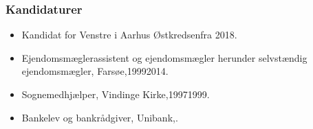 \documentclass[11pt, a4paper]{awesome-cv}
\begin{document}
\begin{cvletter}
\subsubsection*{Kandidaturer}
\begin{itemize}
\item Kandidat for Venstre i Aarhus Østkredsenfra 2018.
\end{itemize}
\begin{itemize}
\item Ejendomsmæglerassistent og ejendomsmægler herunder selvstændig ejendomsmægler, Farsøe,19992014.
\item Sognemedhjælper, Vindinge Kirke,19971999.
\item Bankelev og bankrådgiver, Unibank,.
\end{itemize}
\end{cvletter}
\end{document}

